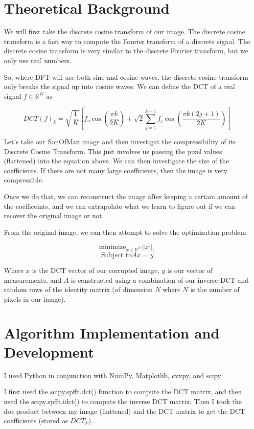 \documentclass[11pt]{amsart}
\begin{document}
\section{Theoretical Background}\label{sec:theory}

We will first take the discrete cosine transform of our image. 
The discrete cosine transform is a fast way to compute the Fourier transform of a discrete signal.
The discrete cosine transform is very similar to the discrete Fourier transform, but we 
only use real numbers. 

So, where DFT will use both sine and cosine waves, the discrete 
cosine transform only breaks the signal up into cosine waves. We can define 
the DCT of a real signal $f \in \mathbb{R}^K$ as 

\[DCT(f)_k = \sqrt{\frac{1}{K}}[f_o\cos(\frac{\pi k}{2K}) + \sqrt{2}\sum_{j = 1}^{k-1}{f_j\cos(\frac{\pi k(2j + 1)}{2K})}]\]

Let's take our SonOfMan image and then investigat the compressibility of its 
Discrete Cosine Transform. This just involves us passing the pixel values (flattened) 
into the equation above. We can then investigate the size of the coefficients. If there are 
not many large coefficients, then the image is very compressible. 

Once we do that, we can reconstruct the image after keeping a certain amount of 
the coefficeints, and we can extrapolate what we learn to figure out if we can recover the original image or not. 

From the original image, we can then attempt to solve the optimization problem 

\[\text{minimize}_{x \in \mathbb{R}^N} ||x||_1\]
\[\text{Subject to} Ax = y\]

Where $x$ is the DCT vector of our corrupted image, $y$ is 
our vector of measurements, and $A$ is constructed using a combination 
of our inverse DCT and random rows of the identity matrix (of dimension $N$ where $N$ is the 
number of pixels in our image).



\section{Algorithm Implementation and Development}\label{sec:algorithms}
I used Python in conjunction with NumPy, Matplotlib, cvxpy, and scipy

I first used the scipy.spfft.dct() function to compute the DCT matrix,
and then used the scipy.spfft.idct() to compute the inverse DCT matrix. Then I took 
the dot product between my image (flattened) and the DCT matrix to get the DCT coefficients
(stored as $DCT_F$).
\end{document}
